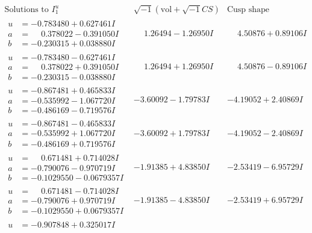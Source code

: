 \documentclass[1p]{elsarticle_modified}
\theoremstyle{definition}
\newcommand{\I}{\sqrt{-1}}
\begin{document}
$$\begin{array}{c|c|c}  
\text{Solutions to }I^u_{1}& \I (\text{vol} + \sqrt{-1}CS) & \text{Cusp shape}\\
 \hline 
\begin{aligned}
u &= -0.783480 + 0.627461 I \\
a &= \phantom{-}0.378022 - 0.391050 I \\
b &= -0.230315 + 0.038880 I\end{aligned}
 & \phantom{-}1.26494 - 1.26950 I & \phantom{-}4.50876 + 0.89106 I \\ \hline\begin{aligned}
u &= -0.783480 - 0.627461 I \\
a &= \phantom{-}0.378022 + 0.391050 I \\
b &= -0.230315 - 0.038880 I\end{aligned}
 & \phantom{-}1.26494 + 1.26950 I & \phantom{-}4.50876 - 0.89106 I \\ \hline\begin{aligned}
u &= -0.867481 + 0.465833 I \\
a &= -0.535992 - 1.067720 I \\
b &= -0.486169 - 0.719576 I\end{aligned}
 & -3.60092 - 1.79783 I & -4.19052 + 2.40869 I \\ \hline\begin{aligned}
u &= -0.867481 - 0.465833 I \\
a &= -0.535992 + 1.067720 I \\
b &= -0.486169 + 0.719576 I\end{aligned}
 & -3.60092 + 1.79783 I & -4.19052 - 2.40869 I \\ \hline\begin{aligned}
u &= \phantom{-}0.671481 + 0.714028 I \\
a &= -0.790076 - 0.970719 I \\
b &= -0.1029550 - 0.0679357 I\end{aligned}
 & -1.91385 + 4.83850 I & -2.53419 - 6.95729 I \\ \hline\begin{aligned}
u &= \phantom{-}0.671481 - 0.714028 I \\
a &= -0.790076 + 0.970719 I \\
b &= -0.1029550 + 0.0679357 I\end{aligned}
 & -1.91385 - 4.83850 I & -2.53419 + 6.95729 I \\ \hline\begin{aligned}
u &= -0.907848 + 0.325017 I \\

\end{aligned}
\end{array}$$
\end{document}

